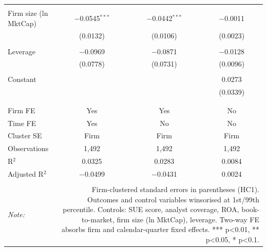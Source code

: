 \begin{table}[!htbp]
\begin{tabular}{@{\extracolsep{5pt}}lccc}
  & & & \\ 
 Firm size (ln MktCap) & $-$0.0545$^{***}$ & $-$0.0442$^{***}$ & $-$0.0011 \\ 
  & (0.0132) & (0.0106) & (0.0023) \\ 
  & & & \\ 
 Leverage & $-$0.0969 & $-$0.0871 & $-$0.0128 \\ 
  & (0.0778) & (0.0731) & (0.0096) \\ 
  & & & \\ 
 Constant &  &  & 0.0273 \\ 
  &  &  & (0.0339) \\ 
  & & & \\ 
\hline \\[-1.8ex] 
Firm FE & Yes & Yes & No \\ 
Time FE & Yes & No & No \\ 
Cluster SE & Firm & Firm & Firm \\ 
Observations & 1,492 & 1,492 & 1,492 \\ 
R$^{2}$ & 0.0325 & 0.0283 & 0.0084 \\ 
Adjusted R$^{2}$ & $-$0.0499 & $-$0.0431 & 0.0024 \\ 
\hline 
\hline \\[-1.8ex] 
\textit{Note:}  & \multicolumn{3}{r}{Firm-clustered standard errors in parentheses (HC1). Outcomes and control variables winsorised at 1st/99th percentile. Controls: SUE score, analyst coverage, ROA, book-to-market, firm size (ln MktCap), leverage. Two-way FE absorbs firm and calendar-quarter fixed effects. *** p<0.01, ** p<0.05, * p<0.1.} \\ 
\end{tabular} 
\end{table} 
